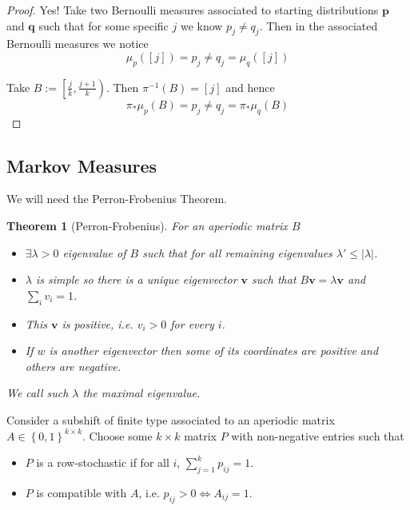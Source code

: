 \documentclass[11pt]{article}
\newcommand{\defeq}{:=}
\newcommand{\abs}[1]{\left|#1\right|}
\newcommand{\mv}[1]{\textbf{#1}}
\newcommand{\mdf}[1]{{\color{RoyalBlue} #1}}
\newtheorem{theorem}[prop]{Theorem}
\begin{document}
\begin{proof}
Yes!
Take two Bernoulli measures associated to starting distributions $\mv{p}$ and $\mv{q}$ such that for some specific $j$ we know $p_j \neq q_j$.
Then in the associated Bernoulli measures we notice
\[
\mu_p(\left[ j\right]) = p_j \neq q_j = \mu_q(\left[ j\right])
\]

Take $B\defeq \left[ \frac{j}{k}, \frac{j+1}{k} \right)$.
Then $\pi^{-1}(B) = \left[ j\right]$ and hence
\[
	\pi_\ast \mu_p(B) = p_j \neq q_j = \pi_\ast \mu_q(B)
\]
\end{proof}

\subsection{Markov Measures}
We will need the Perron-Frobenius Theorem.

\begin{theorem}[Perron-Frobenius]
For an aperiodic matrix $B$
\begin{itemize}
	\item $\exists \lambda > 0$ eigenvalue of $B$ such that for all remaining eigenvalues $\lambda' \leq \abs{\lambda}$.
	\item $\lambda$ is simple so there is a unique eigenvector $\mv{v}$ such that $B\mv{v} = \lambda\mv{v}$ and $\sum_{i}v_i=1$.
	\item This $\mv{v}$ is positive, i.e. $v_i > 0$ for every $i$.
	\item If $w$ is another eigenvector then some of its coordinates are positive and others are negative.
\end{itemize}
We call such $\lambda$ the \mdf{maximal eigenvalue}.
\end{theorem}

Consider a subshift of finite type associated to an aperiodic matrix $A\in\left\{ 0, 1\right\}^{k\times k}$.
Choose some $k\times k$ matrix $P$ with non-negative entries such that
\begin{itemize}
	\item $P$ is a \mdf{row-stochastic} if for all $i$, $\sum_{j=1}^k p_{ij} =1$.
	\item $P$ is \mdf{compatible with $A$}, i.e. $p_{ij} >0 \iff A_{ij}=1$.
\end{itemize}
\end{document}

